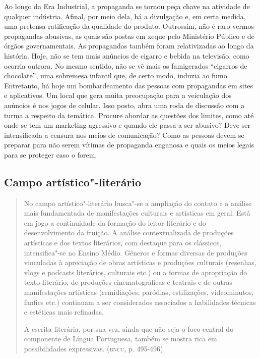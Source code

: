 \documentclass{extarticle}
\begin{document}
Ao longo da Era Industrial, a propaganda se tornou peça chave na
atividade de qualquer indústria. Afinal, por meio dela, há a
divulgação e, em certa medida, uma pretensa ratificação da qualidade
do produto. Outrossim, não é raro vermos propagandas abusivas, as
quais são postas em xeque pelo Ministério Público e de órgãos
governamentais. As propagandas também foram relativizadas ao longo da
história. Hoje, não se tem mais anúncios de cigarro e bebida na
televisão, como ocorria outrora. No mesmo sentido, não se vê mais os
famigerados ``cigarros de chocolate'', uma sobremesa infantil que, de
certo modo, induzia ao fumo. Entretanto, há hoje um bombardeamento das
pessoas com propagandas em sites e aplicativos. Um local que gera
muita preocupação para a veiculação dos anúncios é nos jogos de
celular. Isso posto, abra uma roda de discussão com a turma a respeito
da temática. Procure abordar as questões dos limites, como até onde se
tem um marketing agressivo e quando ele passa a ser abusivo? Deve ser
intensificada a censura nos meios de comunicação? Como as pessoas
devem se preparar para não serem vítimas de propaganda enganosa e
quais os meios legais para se proteger caso o forem.

\subsection{Campo artístico"-literário}

\begin{quote}
No campo artístico"-literário busca"-se a ampliação do contato e a
análise mais fundamentada de manifestações culturais e artísticas em
geral. Está em jogo a continuidade da formação do leitor literário e do
desenvolvimento da fruição. A análise contextualizada de produções
artísticas e dos textos literários, com destaque para os clássicos,
intensifica"-se no Ensino Médio. Gêneros e formas diversas de produções
vinculadas à apreciação de obras artísticas e produções culturais
(resenhas, vlogs e podcasts literários, culturais etc.) ou a formas de
apropriação do texto literário, de produções cinematográficas e teatrais
e de outras manifestações artísticas (remidiações, paródias,
estilizações, videominutos, fanfics etc.) continuam a ser considerados
associados a habilidades técnicas e estéticas mais refinadas.

A escrita literária, por sua vez, ainda que não seja o foco central do
componente de Língua Portuguesa, também se mostra rica em possibilidades
expressivas. (\textsc{bncc}, p. 495-496).
\end{quote}
\end{document}
